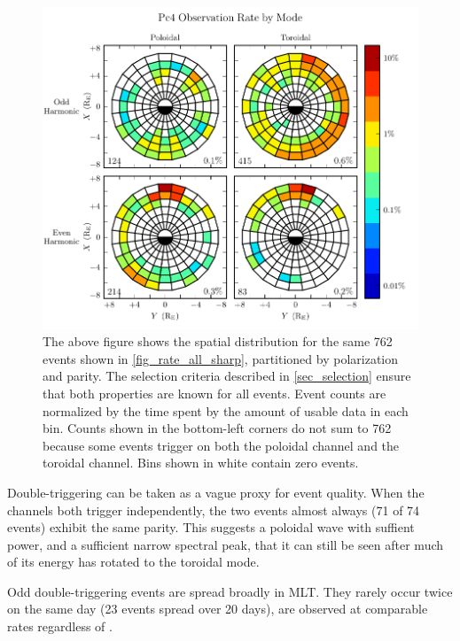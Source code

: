 \begin{figure}[!htb]
    \centering
    \includegraphics[width=\textwidth]{figures/mode_all_sharp.pdf}
    \caption[Observation Rate of Pc4 Events by Mode]{
      The above figure shows the spatial distribution for the same 762 events shown in \cref{fig_rate_all_sharp}, partitioned by polarization and parity. The selection criteria described in \cref{sec_selection} ensure that both properties are known for all events. Event counts are normalized by the time spent by the amount of usable data in each bin. Counts shown in the bottom-left corners do not sum to 762 because some events trigger on both the poloidal channel and the toroidal channel. Bins shown in white contain zero events. 
    }
    \label{fig_mode_all_sharp}
\end{figure}

Double-triggering can be taken as a vague proxy for event quality. When the channels both trigger independently, the two events almost always (71 of 74 events) exhibit the same parity. This suggests a poloidal wave with suffient power, and a sufficient narrow spectral peak, that it can still be seen after much of its energy has rotated to the toroidal mode. 


Odd double-triggering events are spread broadly in MLT. They rarely occur twice on the same day (23 events spread over 20 days), are observed at comparable rates regardless of \DST. 

